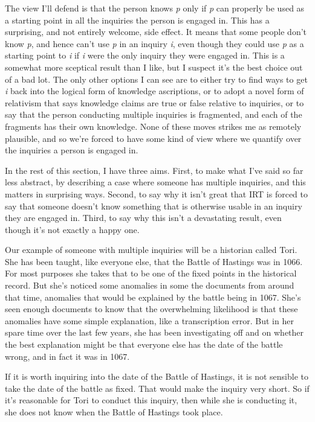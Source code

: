 \documentclass[
  10pt,
  letterpaper,
  twoside]{scrbook}
\begin{document}
The view I'll defend is that the person knows \emph{p} only if \emph{p}
can properly be used as a starting point in all the inquiries the person
is engaged in. This has a surprising, and not entirely welcome, side
effect. It means that some people don't know \emph{p}, and hence can't
use \emph{p} in an inquiry \emph{i}, even though they could use \emph{p}
as a starting point to \emph{i} if \emph{i} were the only inquiry they
were engaged in. This is a somewhat more sceptical result than I like,
but I suspect it's the best choice out of a bad lot. The only other
options I can see are to either try to find ways to get \emph{i} back
into the logical form of knowledge ascriptions, or to adopt a novel form
of relativism that says knowledge claims are true or false relative to
inquiries, or to say that the person conducting multiple inquiries is
fragmented, and each of the fragments has their own knowledge. None of
these moves strikes me as remotely plausible, and so we're forced to
have some kind of view where we quantify over the inquiries a person is
engaged in.

In the rest of this section, I have three aims. First, to make what I've
said so far less abstract, by describing a case where someone has
multiple inquiries, and this matters in surprising ways. Second, to say
why it isn't great that IRT is forced to say that someone doesn't know
something that is otherwise usable in an inquiry they are engaged in.
Third, to say why this isn't a devastating result, even though it's not
exactly a happy one.

Our example of someone with multiple inquiries will be a historian
called Tori. She has been taught, like everyone else, that the Battle of
Hastings was in 1066. For most purposes she takes that to be one of the
fixed points in the historical record. But she's noticed some anomalies
in some the documents from around that time, anomalies that would be
explained by the battle being in 1067. She's seen enough documents to
know that the overwhelming likelihood is that these anomalies have some
simple explanation, like a transcription error. But in her spare time
over the last few years, she has been investigating off and on whether
the best explanation might be that everyone else has the date of the
battle wrong, and in fact it was in 1067.

If it is worth inquiring into the date of the Battle of Hastings, it is
not sensible to take the date of the battle as fixed. That would make
the inquiry very short. So if it's reasonable for Tori to conduct this
inquiry, then while she is conducting it, she does not know when the
Battle of Hastings took place.
\end{document}
